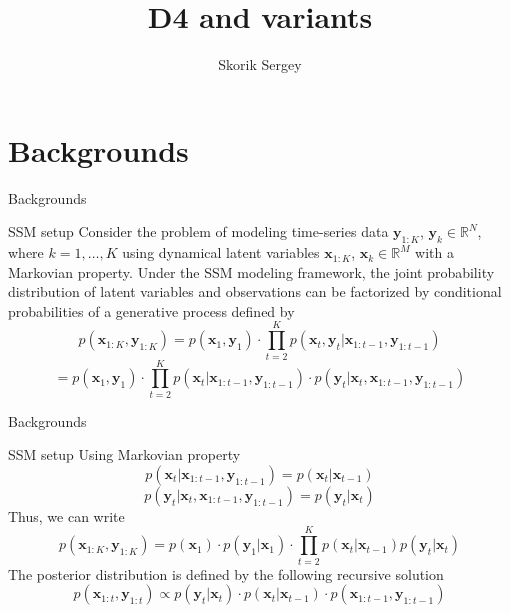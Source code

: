 \documentclass{beamer}
\title{D4 and variants}
\author{Skorik Sergey}
\institute{MIPT, 2023}
\begin{document}
\begin{frame}
    \titlepage
\end{frame}

\begin{frame}
    \tableofcontents
\end{frame}

\section{Backgrounds}

\begin{frame}{Backgrounds}
    \begin{block}{SSM setup}
        Consider the problem of modeling time-series data $\boldsymbol{y}_{1:K}$, $\boldsymbol{y}_k \in \mathbb{R}^N$, where $k = 1, \ldots, K$ using dynamical latent variables $\boldsymbol{x}_{1:K}$, $\boldsymbol{x}_k \in \mathbb{R}^M$ with a Markovian property. Under the SSM modeling framework, the joint probability distribution of latent variables and observations can be factorized by conditional probabilities of a generative process defined by
        $$p(\boldsymbol{x}_{1:K}, \boldsymbol{y}_{1:K}) = p(\boldsymbol{x}_{1}, \boldsymbol{y}_{1})\cdot\prod_{t=2}^{K}p(\boldsymbol{x}_{t}, \boldsymbol{y}_{t} | \boldsymbol{x}_{1:t-1}, \boldsymbol{y}_{1:t-1})$$
        $$ = p(\boldsymbol{x}_{1}, \boldsymbol{y}_{1})\cdot\prod_{t=2}^{K}p(\boldsymbol{x}_{t}| \boldsymbol{x}_{1:t-1}, \boldsymbol{y}_{1:t-1})\cdot p(\boldsymbol{y}_{t}| \boldsymbol{x}_{t}, \boldsymbol{x}_{1:t-1}, \boldsymbol{y}_{1:t-1})$$
    \end{block}
\end{frame}

\begin{frame}{Backgrounds}
    \begin{block}{SSM setup}
        Using Markovian property 
        $$p(\boldsymbol{x}_{t}| \boldsymbol{x}_{1:t-1}, \boldsymbol{y}_{1:t-1}) = p(\boldsymbol{x}_{t} | \boldsymbol{x}_{t-1})$$
        $$p(\boldsymbol{y}_{t}| \boldsymbol{x}_{t}, \boldsymbol{x}_{1:t-1}, \boldsymbol{y}_{1:t-1}) = p(\boldsymbol{y}_{t} | \boldsymbol{x}_{t})$$
        Thus, we can write
        $$p(\boldsymbol{x}_{1:K}, \boldsymbol{y}_{1:K}) = p(\boldsymbol{x}_1)\cdot p (\boldsymbol{y}_1 | \boldsymbol{x}_1)\cdot\prod_{t=2}^{K}p(\boldsymbol{x}_{t}| \boldsymbol{x}_{t-1})p(\boldsymbol{y}_{t}| \boldsymbol{x}_{t})$$
        The posterior distribution is defined by the following recursive solution
        $$p(\boldsymbol{x}_{1:t}, \boldsymbol{y}_{1:t}) \propto p(\boldsymbol{y}_{t}| \boldsymbol{x}_{t}) \cdot p(\boldsymbol{x}_{t}| \boldsymbol{x}_{t-1})\cdot p(\boldsymbol{x}_{1:t-1}, \boldsymbol{y}_{1:t-1})$$
    \end{block}
\end{frame}
\end{document}
